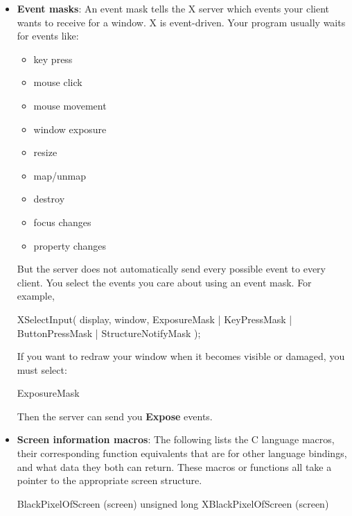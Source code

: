 \documentclass{report}
\begin{document}
\begin{itemize}
\begin{align*}
            \end{align*}
        \item \textbf{Event masks}: An event mask tells the X server which events your client wants to receive for a window. X is event-driven. Your program usually waits for events like:
            \begin{itemize}
                \item key press
                \item mouse click
                \item mouse movement
                \item window exposure
                \item resize
                \item map/unmap
                \item destroy
                \item focus changes
                \item property changes
            \end{itemize}
            But the server does not automatically send every possible event to every client. You select the events you care about using an event mask.
            \bigbreak \noindent 
            For example,
            \bigbreak \noindent 
            \begin{cppcode}
                XSelectInput(
                    display,
                    window,
                    ExposureMask | KeyPressMask | ButtonPressMask | StructureNotifyMask
                );
            \end{cppcode}
            \bigbreak \noindent 
            If you want to redraw your window when it becomes visible or damaged, you must select:
            \begin{cppcode}
            ExposureMask
            \end{cppcode}
            \bigbreak \noindent 
            Then the server can send you \textbf{Expose} events.
        \item \textbf{Screen information macros}: The following lists the C language macros, their corresponding function equivalents that are for other language bindings, and what data they both can return. These macros or functions all take a pointer to the appropriate screen structure.
            \bigbreak \noindent 
            \begin{cppcode}
                BlackPixelOfScreen (screen)
                unsigned long XBlackPixelOfScreen (screen)
            \end{cppcode}

\end{itemize}
\end{document}
